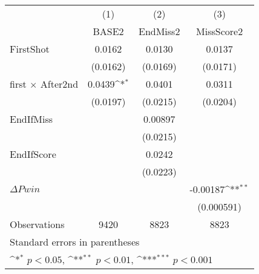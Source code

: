 {
\def\sym#1{\ifmmode^{#1}\else\(^{#1}\)\fi}
\begin{tabular}{l*{3}{c}}
\hline\hline
                    &\multicolumn{1}{c}{(1)}&\multicolumn{1}{c}{(2)}&\multicolumn{1}{c}{(3)}\\
                    &\multicolumn{1}{c}{BASE2}&\multicolumn{1}{c}{EndMiss2}&\multicolumn{1}{c}{MissScore2}\\
\hline
FirstShot           &      0.0162         &      0.0130         &      0.0137         \\
                    &    (0.0162)         &    (0.0169)         &    (0.0171)         \\
[1em]
first $\times$ After2nd&      0.0439\sym{*}  &      0.0401         &      0.0311         \\
                    &    (0.0197)         &    (0.0215)         &    (0.0204)         \\
[1em]
EndIfMiss           &                     &     0.00897         &                     \\
                    &                     &    (0.0215)         &                     \\
[1em]
EndIfScore          &                     &      0.0242         &                     \\
                    &                     &    (0.0223)         &                     \\
[1em]
$\Delta Pwin$       &                     &                     &    -0.00187\sym{**} \\
                    &                     &                     &  (0.000591)         \\
\hline
Observations        &        9420         &        8823         &        8823         \\
\hline\hline
\multicolumn{4}{l}{\footnotesize Standard errors in parentheses}\\
\multicolumn{4}{l}{\footnotesize \sym{*} \(p<0.05\), \sym{**} \(p<0.01\), \sym{***} \(p<0.001\)}\\
\end{tabular}
}
